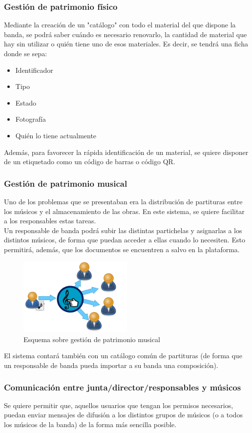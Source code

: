 \documentclass[11pt,spanish]{article}
\begin{document}
\subsubsection{Gestión de patrimonio físico}
Mediante la creación de un "catálogo" con todo el material del que dispone la banda,
se podrá saber cuándo es necesario renovarlo, la cantidad de material que hay sin utilizar
o quién tiene uno de esos materiales. Es decir, se tendrá una ficha donde se sepa:

\begin{itemize}
  \item Identificador
  \item Tipo
  \item Estado
  \item Fotografía
  \item Quién lo tiene actualmente
\end{itemize}

Además, para favorecer la rápida identificación de un material, se quiere
disponer de un etiquetado como un código de barras o código QR.


\subsubsection{Gestión de patrimonio musical}
Uno de los problemas que se presentaban era la distribución de partituras entre los
músicos y el almacenamiento de las obras. En este sistema, se quiere facilitar a los
responsables estas tareas.\\
Un responsable de banda podrá subir las distintas partichelas y asignarlas a los
distintos músicos, de forma que puedan acceder a ellas cuando lo necesiten. Esto
permitirá, además, que los documentos se encuentren a salvo en la plataforma.
\begin{figure}[!h]
\centering
\includegraphics[width=0.5\textwidth]{img/patrimonio_musical.jpg}
\caption{Esquema sobre gestión de patrimonio musical}
\end{figure}

El sistema contará también con un catálogo común de partituras (de forma que un
responsable de banda pueda importar a su banda una composición).


\subsubsection{Comunicación entre junta/director/responsables y músicos}
Se quiere permitir que, aquellos usuarios que tengan los permisos necesarios,
puedan enviar mensajes de difusión a los distintos grupos de músicos (o a todos los
músicos de la banda) de la forma más sencilla posible.
\end{document}
